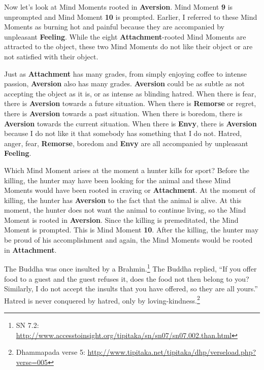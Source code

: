 Now let’s look at Mind Moments rooted in \textbf{Aversion}. Mind Moment \textbf{9} is unprompted and Mind Moment \textbf{10} is prompted. Earlier, I referred to these Mind Moments as burning hot and painful because they are accompanied by unpleasant \textbf{Feeling}. While the eight \textbf{Attachment}-rooted Mind Moments are attracted to the object, these two Mind Moments do not like their object or are not satisfied with their object.

Just as \textbf{Attachment} has many grades, from simply enjoying coffee to intense passion, \textbf{Aversion} also has many grades. \textbf{Aversion} could be as subtle as not accepting the object as it is, or as intense as blinding hatred. When there is fear, there is \textbf{Aversion} towards a future situation. When there is \textbf{Remorse} or regret, there is \textbf{Aversion} towards a past situation. When there is boredom, there is \textbf{Aversion} towards the current situation. When there is \textbf{Envy}, there is \textbf{Aversion} because I do not like it that somebody has something that I do not. Hatred, anger, fear, \textbf{Remorse}, boredom and \textbf{Envy} are all accompanied by unpleasant \textbf{Feeling}.

Which Mind Moment arises at the moment a hunter kills for sport? Before the killing, the hunter may have been looking for the animal and these Mind Moments would have been rooted in craving or \textbf{Attachment}. At the moment of killing, the hunter has \textbf{Aversion} to the fact that the animal is alive. At this moment, the hunter does not want the animal to continue living, so the Mind Moment is rooted in \textbf{Aversion}. Since the killing is premeditated, the Mind Moment is prompted. This is Mind Moment \textbf{10}. After the killing, the hunter may be proud of his accomplishment and again, the Mind Moments would be rooted in \textbf{Attachment}.

The Buddha was once insulted by a Brahmin.\footnote{SN 7.2: \url{http://www.accesstoinsight.org/tipitaka/sn/sn07/sn07.002.than.html}} The Buddha replied, “If you offer food to a guest and the guest refuses it, does the food not then belong to you? Similarly, I do not accept the insults that you have offered, so they are all yours.” Hatred is never conquered by hatred, only by loving-kindness.\footnote{Dhammapada verse 5: \url{http://www.tipitaka.net/tipitaka/dhp/verseload.php?verse=005}}

